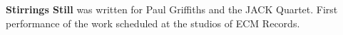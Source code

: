 \textbf{Stirrings Still} was written for Paul Griffiths and the JACK Quartet. First
performance of the work scheduled at the studios of ECM Records.

